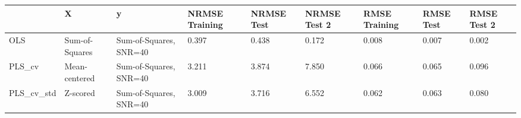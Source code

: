 \begin{tabular}{lllllllll}
\toprule
{} &               X &                       y & NRMSE Training & NRMSE Test & NRMSE Test 2 & RMSE Training & RMSE Test & RMSE Test 2 \\
\midrule
OLS        &  Sum-of-Squares &  Sum-of-Squares, SNR=40 &          0.397 &      0.438 &        0.172 &         0.008 &     0.007 &       0.002 \\
PLS_cv     &   Mean-centered &  Sum-of-Squares, SNR=40 &          3.211 &      3.874 &        7.850 &         0.066 &     0.065 &       0.096 \\
PLS_cv_std &        Z-scored &  Sum-of-Squares, SNR=40 &          3.009 &      3.716 &        6.552 &         0.062 &     0.063 &       0.080 \\
\bottomrule
\end{tabular}
